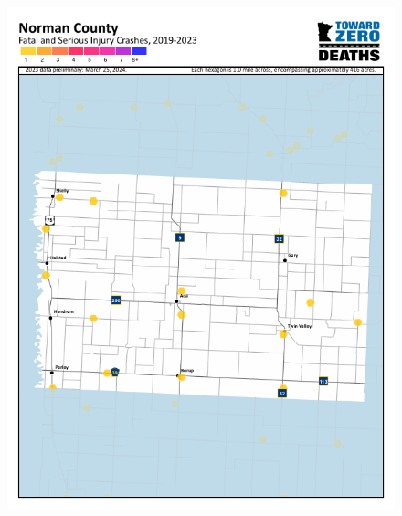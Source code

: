 \documentclass[
  a4paper,
  landscape]{scrreprt}
\begin{document}
\begin{figure}[H]
\begin{minipage}{0.33\linewidth}
\href{https://www.minnesotatzd.org/regions/northwest}{\includegraphics{pages/Attachments/popEnvironmentalHealth/countyNormanMap_crashes2019_2023.png}}\end{minipage}%
%
\begin{minipage}{0.33\linewidth}

\end{minipage}
\end{figure}
\end{document}
